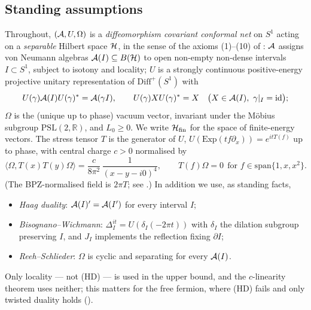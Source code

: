 \subsection{Standing assumptions}\label{ss:standing}

Throughout, $(\mathcal A,U,\Omega)$ is a \emph{diffeomorphism covariant conformal net} on $S^1$ acting on a
\emph{separable} Hilbert space $\mathcal H$, in the sense of the axioms (1)--(10) of \cite[\S4]{CDIT}:
$\mathcal A$ assigns von Neumann algebras $\mathcal A(I)\subseteq B(\mathcal H)$ to open non-empty non-dense intervals
$I\subset S^1$, subject to isotony and locality; $U$ is a strongly continuous positive-energy projective
unitary representation of $\mathrm{Diff}^+(S^1)$ with
\begin{equation}\label{eq:cov}
 U(\gamma)\cA(I)U(\gamma)^*=\cA(\gamma I),\qquad
 U(\gamma)XU(\gamma)^*=X\quad\bigl(X\in\cA(I),\ \gamma|_{I}=\mathrm{id}\bigr);
\end{equation}
$\Omega$ is the (unique up to phase) vacuum vector, invariant under the M\"obius subgroup
$\mathrm{PSL}(2,\mathbb R)$, and $L_0\ge0$.  We write $\mathcal H_{\rm fin}$ for the space of finite-energy
vectors.  The stress tensor $T$ is the generator of $U$,
$U(\mathrm{Exp}(tf\partial_x))=e^{itT(f)}$ up to phase, with central charge $c>0$ normalised by
\begin{equation}\label{eq:TT}
 \langle\Omega,T(x)T(y)\Omega\rangle=\frac{c}{8\pi^{2}}\,\frac{1}{(x-y-i0)^{4}},
 \qquad T(f)\Omega=0\ \ \text{for }f\in\mathrm{span}\{1,x,x^{2}\}.
\end{equation}
(The BPZ-normalised field is $2\pi T$; see .)  In addition we use, as standing facts,
\begin{itemize}[leftmargin=2.6em]
\item[(HD)] \emph{Haag duality}: $\mathcal A(I)'=\mathcal A(I')$ for every interval $I$;
\item[(BW)] \emph{Bisognano--Wichmann}: $\Delta_I^{it}=U(\delta_I(-2\pi t))$ with $\delta_I$ the dilation
 subgroup preserving $I$, and $J_I$ implements the reflection fixing $\partial I$;
\item[(RS)] \emph{Reeh--Schlieder}: $\Omega$ is cyclic and separating for every $\mathcal A(I)$.
\end{itemize}
Only locality --- not (HD) --- is used in the upper bound, and the $c$-linearity theorem uses neither; this matters
for the free fermion, where (HD) fails and only twisted duality holds ().

